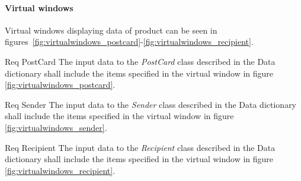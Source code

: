 \documentclass[10pt,a4paper]{article}
\begin{document}
\paragraph{Virtual windows}
Virtual windows displaying data of product can be seen in figures~\ref{fig:virtualwindows_postcard}-\ref{fig:virtualwindows_recipient}.

\begin {description}
	\item [Req \thesubsubsection {.\thedata} PostCard] The input data to the \textit{PostCard} class described in the Data dictionary shall include the items specified in the virtual window in figure \ref{fig:virtualwindows_postcard}.

	\item [Req \thesubsubsection {.\thedata} Sender] The input data to the \textit{Sender} class described in the Data dictionary shall include the items specified in the virtual window in figure \ref{fig:virtualwindows_sender}.

	\item [Req \thesubsubsection {.\thedata} Recipient] The input data to the \textit{Recipient} class described in the Data dictionary shall include the items specified in the virtual window in figure \ref{fig:virtualwindows_recipient}.

\end{description}
\hfill
\end{document}
